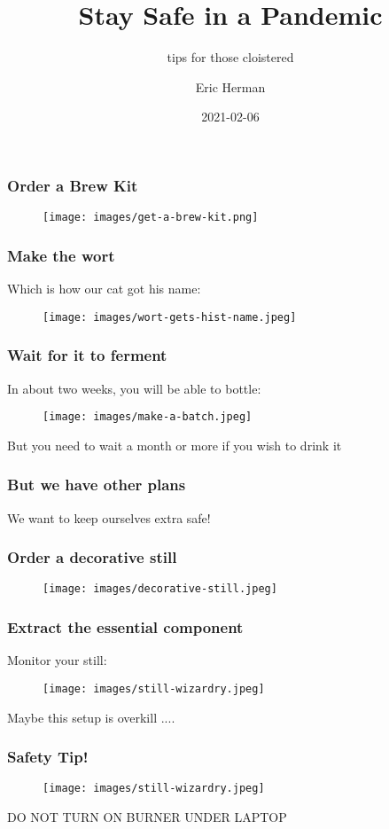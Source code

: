 \documentclass{beamer}
\title{Stay Safe in a Pandemic}
\subtitle{tips for those cloistered}
\author{Eric Herman}
\date{2021-02-06}
\begin{document}
\frame{\titlepage}

\begin{frame}
\frametitle{Order a Brew Kit}
\begin{figure}
\texttt{[image: images/get-a-brew-kit.png]}
\end{figure}
\end{frame}

\begin{frame}
\frametitle{Make the wort}
Which is how our cat got his name:
\begin{figure}
\texttt{[image: images/wort-gets-hist-name.jpeg]}
\end{figure}
\end{frame}

\begin{frame}
\frametitle{Wait for it to ferment}
In about two weeks, you will be able to bottle:
\begin{figure}
\texttt{[image: images/make-a-batch.jpeg]}
\end{figure}
But you need to wait a month or more if you wish to drink it
\end{frame}

\begin{frame}
\frametitle{But we have other plans}
\huge{We want to keep ourselves extra safe!}
\end{frame}

\begin{frame}
\frametitle{Order a decorative still}
\begin{figure}
\texttt{[image: images/decorative-still.jpeg]}
\end{figure}
\end{frame}

\begin{frame}
\frametitle{Extract the essential component}
Monitor your still:
\begin{figure}
\texttt{[image: images/still-wizardry.jpeg]}
\end{figure}
Maybe this setup is overkill ....
\end{frame}

\begin{frame}
\frametitle{Safety Tip!}
\begin{figure}
\texttt{[image: images/still-wizardry.jpeg]}
\end{figure}
\huge{DO NOT TURN ON BURNER UNDER LAPTOP}
\end{frame}
\end{document}

